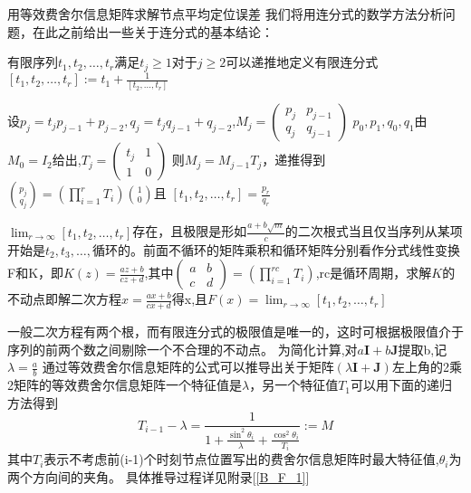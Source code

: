 {用等效费舍尔信息矩阵求解节点平均定位误差}
我们将用连分式的数学方法分析问题，在此之前给出一些关于连分式的基本结论\cite{ContinuedFraction}：
\begin{definition}
  有限序列$t_1,t_2,\dots,t_r$满足$t_j\geq 1$对于$j\geq2$可以递推地定义有限连分式$[t_1,t_2,\dots,t_r]:=t_1+\frac{1}{[t_2,\dots,t_r]}$
\end{definition}
\begin{theorem}\label{thm:basic}
  设$p_j=t_j p_{j-1}+p_{j-2},q_j=t_j q_{j-1}+q_{j-2}$,$M_j=(\begin{matrix}p_j&p_{j-1}\\q_j&q_{j-1}\end{matrix})$
  $p_0,p_1,q_0,q_1$由$M_0=I_2$给出,$T_j=(\begin{matrix}t_j&1\\1&0\end{matrix})$
  则$M_j=M_{j-1}T_j$，递推得到$\binom{p_j}{q_j}=(\prod_{i=1}^r T_i )\binom{1}{0}$且
  $[t_1,t_2,\dots,t_r]=\frac{p_r}{q_r}$
\end{theorem}
\begin{theorem}
$\lim_{r\to \infty}[t_1,t_2,\dots,t_r]$存在，且极限是形如$\frac{a+b\sqrt{m}}{c}$的二次根式当且仅当序列从某项开始是$t_2,t_3,\dots,$循环的。前面不循环的矩阵乘积和循环矩阵分别看作分式线性变换F和K，即$K(z)=\frac{az+b}{cz+d}$,其中$(\begin{matrix}a&b\\c&d\end{matrix})=(\prod_{i=1}^{rc} T_i)$,rc是循环周期，求解$K$的不动点即解二次方程$x=\frac{ax+b}{cx+d}$得x,且$F(x)=\lim_{r\to \infty}[t_1,t_2,\dots,t_r]$
\end{theorem}
一般二次方程有两个根，而有限连分式的极限值是唯一的，这时可根据极限值介于序列的前两个数之间剔除一个不合理的不动点。
为简化计算,对$a\bm{I}+b\bm{J}$提取b,记$\lambda=\frac{a}{b}$
通过等效费舍尔信息矩阵的公式可以推导出关于矩阵$(\lambda\bm{I}+\bm{J})$左上角的2乘2矩阵的等效费舍尔信息矩阵一个特征值是$\lambda$，另一个特征值$T_1$可以用下面的递归方法得到
\begin{equation}\label{eq:recursive_efim}
T_{i-1}-\lambda=\frac{1}{1+\frac{\sin^2\theta_i}{\lambda}+\frac{\cos^2\theta_i}{T_i}}:=M
\end{equation}
其中$T_i$表示不考虑前(i-1)个时刻节点位置写出的费舍尔信息矩阵时最大特征值,$\theta_i$为两个方向间的夹角。
具体推导过程详见附录[\ref{B_F_1}]

